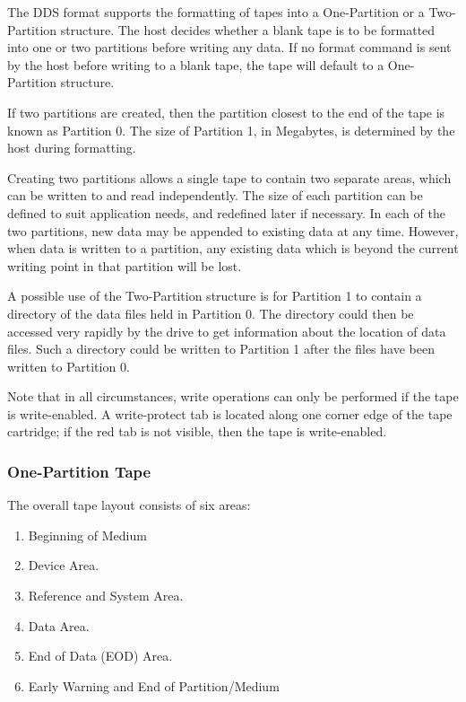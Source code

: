\documentclass[11pt]{article}
\begin{document}
The DDS format supports the formatting of tapes into a One-Partition or a
Two-Partition structure. The host decides whether a blank tape is to be
formatted into one or two partitions before writing any data. If no format
command is sent by the host before writing to a blank tape, the tape will
default to a One-Partition structure.

If two partitions are created, then the partition closest to the end of the
tape is known as Partition 0. The size of Partition 1, in Megabytes, is
determined by the host during formatting.

Creating two partitions allows a single tape to contain two separate areas,
which can be written to and read independently. The size of each partition
can be defined to suit application needs, and redefined later if necessary.
In each of the two partitions, new data may be appended to existing data at
any time. However, when data is written to a partition, any existing data
which is beyond the current writing point in that partition will be lost.

A possible use of the Two-Partition structure is for Partition 1 to contain
a directory of the data files held in Partition 0. The directory could then
be accessed very rapidly by the drive to get information about the location
of data files. Such a directory could be written to Partition 1 after the
files have been written to Partition 0.

Note that in all circumstances, write operations can only be performed if
the tape is write-enabled. A write-protect tab is located along one corner
edge of the tape cartridge; if the red tab is not visible, then the tape is
write-enabled.

\subsubsection {One-Partition Tape}

The overall tape layout consists of six areas:

\begin {enumerate}

\item Beginning of Medium

\item Device Area.

\item Reference and System Area.

\item Data Area.

\item End of Data (EOD) Area.

\item Early Warning and End of Partition/Medium

\end {enumerate}
\end{document}
